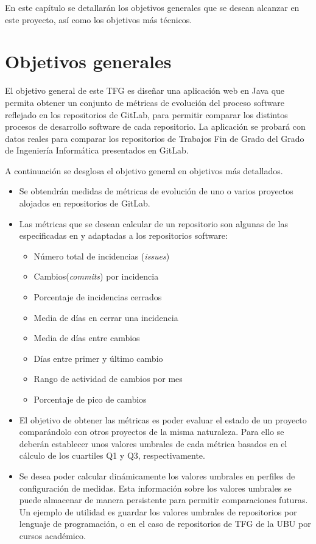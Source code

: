 
En este capítulo se detallarán los objetivos generales que se desean alcanzar en este proyecto, así como los objetivos más técnicos.

\section{Objetivos generales}
El objetivo general de este TFG es diseñar una aplicación web en Java que permita obtener un conjunto de métricas de evolución del proceso software \cite{ratzinger_space:_2007} reflejado en los repositorios de GitLab, para permitir comparar los distintos procesos de desarrollo software de cada repositorio.
La aplicación se probará con datos reales para comparar los repositorios de Trabajos Fin de Grado del Grado de Ingeniería Informática presentados en GitLab.
   
A continuación se desglosa el objetivo general  en objetivos más detallados.
\begin{itemize}
	\tightlist
	\item Se obtendrán medidas de métricas de evolución de uno o varios proyectos alojados en repositorios de GitLab.
	\item Las métricas que se desean calcular de un repositorio  son algunas de las especificadas en \cite{ratzinger_space:_2007} y 
	adaptadas a los repositorios software:
	\begin{itemize}
		\tightlist
		\item Número total de incidencias (\textit{issues})
		\item Cambios(\textit{commits}) por incidencia
		\item Porcentaje de incidencias cerrados
		\item Media de días en cerrar una incidencia
		\item Media de días entre cambios
		\item Días entre primer y último cambio
		\item Rango de actividad de cambios por mes
		\item Porcentaje de pico de cambios
	\end{itemize}
	\item El objetivo de obtener las métricas es poder evaluar el estado de un proyecto comparándolo con otros proyectos de la misma naturaleza. Para ello se deberán establecer unos valores umbrales de cada métrica basados en el cálculo de los cuartiles Q1 y Q3, respectivamente.
	\item Se desea poder calcular dinámicamente los valores umbrales en perfiles de configuración de medidas. Esta información sobre los
	valores umbrales se puede almacenar de manera persistente para permitir comparaciones futuras. Un ejemplo de utilidad es guardar los valores umbrales 
	de repositorios por lenguaje de programación, o en el caso de repositorios de TFG de la UBU por cursos académico.
\end{itemize}
